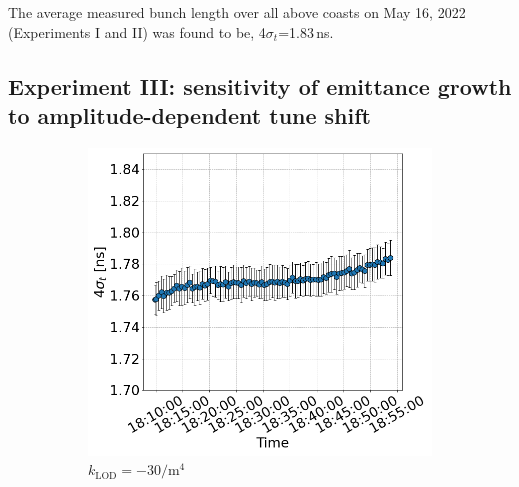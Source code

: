  
 The average measured bunch length over all above coasts on May 16, 2022 (Experiments I and II) was found to be, 4$\sigma_t$=1.83\,ns. 
 
 
 

 \subsection{Experiment III: sensitivity of emittance growth to amplitude-dependent tune shift}\label{subsec:2022_exp3_bunch_length}

 \begin{figure}[htp]
    \centering
    \begin{subfigure}{.45\textwidth}
        \centering
        \includegraphics[width=.95\linewidth]{images/app_c/bunch_length_cc_md_sep_coast6.png}  
        \caption{$k_\mathrm{LOD}=-30 \mathrm{/m^{4}}$}
    \end{subfigure}
    \begin{subfigure}{.45\textwidth}
        \centering

\end{subfigure}
\end{figure}
